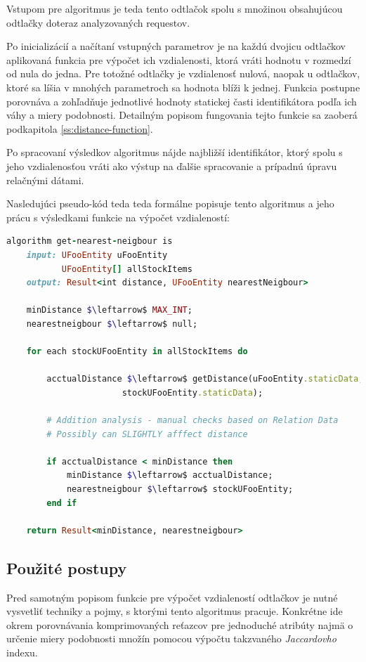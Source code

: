 \documentclass[
  digital, %
  table,   %
  lof,     %
  nolot,   %
  nocover
]{fithesis3}
\begin{document}
Vstupom pre algoritmus je teda tento odtlačok
spolu s množinou obsahujúcou odtlačky doteraz analyzovaných requestov.

Po
inicializácií a načítaní vstupných parametrov je na každú dvojicu odtlačkov
aplikovaná funkcia pre výpočet ich vzdialenosti, ktorá vráti hodnotu v rozmedzí
od nula do jedna. Pre totožné odtlačky je vzdialenosť nulová, naopak u
odtlačkov, ktoré sa líšia v mnohých parametroch sa hodnota blíži k jednej.
Funkcia postupne porovnáva a zohľadňuje jednotlivé hodnoty statickej časti
identifikátora podľa ich váhy a miery podobnosti. Detailným popisom fungovania
tejto funkcie sa zaoberá podkapitola \ref{ss:distance-function}. 

Po spracovaní
výsledkov algoritmus nájde najbližší identifikátor, ktorý spolu s jeho
vzdialenosťou vráti ako výstup na ďalšie spracovanie a prípadnú úpravu
relačnými dátami.

Nasledujúci pseudo-kód teda teda formálne popisuje tento algoritmus a jeho prácu s
výsledkami funkcie na výpočet vzdialeností:
\begin{lstlisting}[basicstyle=\footnotesize, language=Ruby, mathescape]
algorithm get-nearest-neigbour is
    input: UFooEntity uFooEntity
           UFooEntity[] allStockItems
    output: Result<int distance, UFooEntity nearestNeigbour>

    minDistance $\leftarrow$ MAX_INT;
    nearestneigbour $\leftarrow$ null;

    for each stockUFooEntity in allStockItems do

        acctualDistance $\leftarrow$ getDistance(uFooEntity.staticData,
                       stockUFooEntity.staticData);

        # Addition analysis - manual checks based on Relation Data
        # Possibly can SLIGHTLY afffect distance 

        if acctualDistance < minDistance then
            minDistance $\leftarrow$ acctualDistance;
            nearestneigbour $\leftarrow$ stockUFooEntity;
        end if
    
    return Result<minDistance, nearestneigbour>
\end{lstlisting}

\subsection{Použité postupy}
Pred samotným popisom funkcie pre výpočet vzdialeností odtlačkov je nutné
vysvetliť techniky a pojmy, s ktorými tento algoritmus pracuje. Konkrétne ide
okrem porovnávania komprimovaných reťazcov pre jednoduché atribúty najmä o 
určenie miery podobnosti množín pomocou výpočtu takzvaného
\textit{Jaccardovho} indexu.
\end{document}
